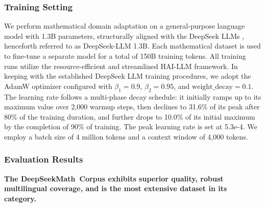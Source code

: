 \subsubsection{Training Setting}
\label{sec:quality-policy}
We perform mathematical domain adaptation on a general-purpose language model with 1.3B parameters, structurally aligned with the DeepSeek LLMs \citep{deepseek-llm}, henceforth referred to as DeepSeek-LLM 1.3B. Each mathematical dataset is used to fine-tune a separate model for a total of 150B training tokens. All training runs utilize the resource-efficient and streamlined HAI-LLM \citep{haillm} framework. In keeping with the established DeepSeek LLM training procedures, we adopt the AdamW optimizer \citep{adamW} configured with $\beta_1=0.9$, $\beta_2=0.95$, and $\mathrm{weight\_decay}=0.1$. The learning rate follows a multi-phase decay schedule: it initially ramps up to its maximum value over 2,000 warmup steps, then declines to 31.6\% of its peak after 80\% of the training duration, and further drops to 10.0\% of its initial maximum by the completion of 90\% of training. The peak learning rate is set at 5.3e-4. We employ a batch size of 4 million tokens and a context window of 4,000 tokens.

\subsubsection{Evaluation Results}

\textbf{The DeepSeekMath~Corpus exhibits superior quality, robust multilingual coverage, and is the most extensive dataset in its category.}

